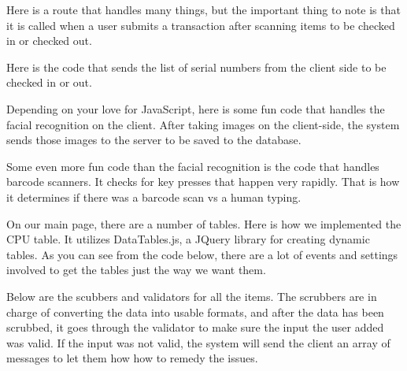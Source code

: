 \documentclass[10pt, onecolumn, twoside, peerreview]{IEEEtran}
\begin{document}


Here is a route that handles many things, but the important thing to note is that it is called when a user submits a transaction after scanning items to be checked in or checked out.



Here is the code that sends the list of serial numbers from the client side to be checked in or out.



Depending on your love for JavaScript, here is some fun code that handles the facial recognition on the client.
After taking images on the client-side, the system sends those images to the server to be saved to the database.



Some even more fun code than the facial recognition is the code that handles barcode scanners. It checks for key presses that happen very rapidly. That is how it determines if there was a barcode scan vs a human typing.



On our main page, there are a number of tables. Here is how we implemented the CPU table. It utilizes DataTables.js, a JQuery library for creating dynamic tables. As you can see from the code below, there are a lot of events and settings involved to get the tables just the way we want them.




Below are the scubbers and validators for all the items. The scrubbers are in charge of converting the data into usable formats, and after the data has been scrubbed, it goes through the validator to make sure the input the user added was valid. If the input was not valid, the system will send the client an array of messages to let them how how to remedy the issues.



\end{document}
